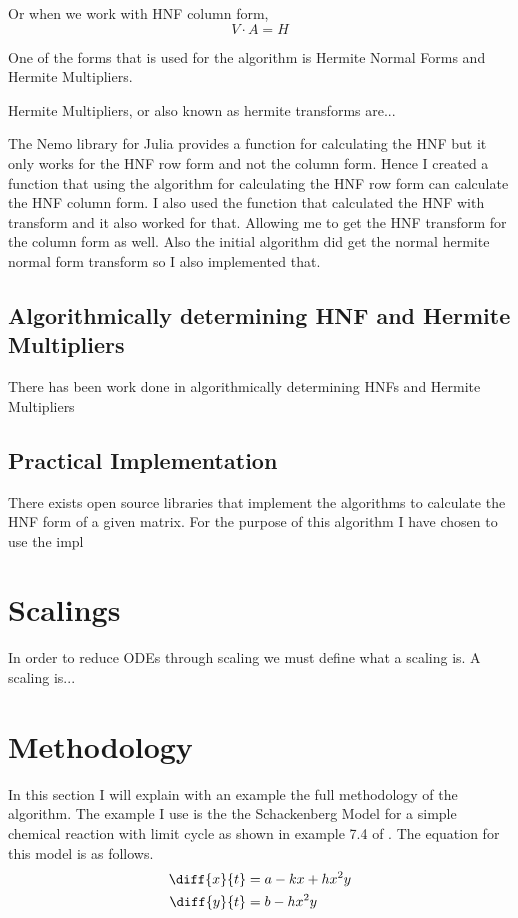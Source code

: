 \documentclass[oneside, a4paper, onecolumn, 11pt]{article}
\begin{document}
Or when we work with HNF column form,
\[V \cdot A = H\]

One of the forms that is used for the algorithm is Hermite Normal Forms and Hermite Multipliers.

Hermite Multipliers, or also known as hermite transforms are...

The Nemo library for Julia provides a function for calculating the HNF but it only works for the HNF row form and not the column form. Hence I created a function that using the algorithm for calculating the HNF row form can calculate the HNF column form. I also used the function that calculated the HNF with transform and it also worked for that. Allowing me to get the HNF transform for the column form as well. Also the initial algorithm did get the normal hermite normal form transform so I also implemented that.

\subsection{Algorithmically determining HNF and Hermite Multipliers}

There has been work done in algorithmically determining HNFs and Hermite Multipliers

\subsection{Practical Implementation}

There exists open source libraries that implement the algorithms to calculate the HNF form of a given matrix. For the purpose of this algorithm I have chosen to use the impl


\section{Scalings}

In order to reduce ODEs through scaling we must define what a scaling is. A scaling is...

\section{Methodology}

In this section I will explain with an example the full methodology of the algorithm. The example I use is the the Schackenberg Model for a simple chemical reaction with limit cycle as shown in example 7.4 of \cite{Hubert2013}. The equation for this model is as follows.
\begin{align*}
    \diff{x}{t}
     & = a - kx + hx^2y \\
    \diff{y}{t}
     & = b - h x^2 y
\end{align*}
\end{document}
